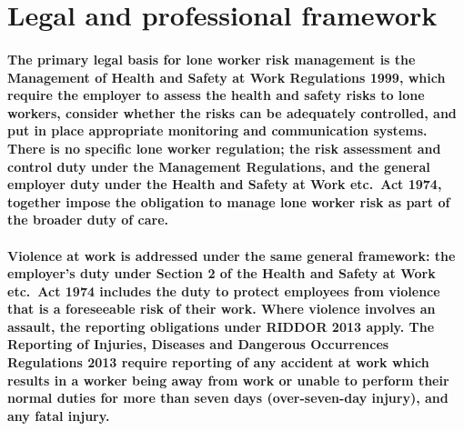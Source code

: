 \section{Legal and professional framework}

\paragraph{The primary legal basis for lone worker risk management is the Management of Health and Safety at Work Regulations 1999, which require the employer to assess the health and safety risks to lone workers, consider whether the risks can be adequately controlled, and put in place appropriate monitoring and communication systems. There is no specific lone worker regulation; the risk assessment and control duty under the Management Regulations, and the general employer duty under the Health and Safety at Work etc.\ Act 1974, together impose the obligation to manage lone worker risk as part of the broader duty of care.}

\paragraph{Violence at work is addressed under the same general framework: the employer's duty under Section 2 of the Health and Safety at Work etc.\ Act 1974 includes the duty to protect employees from violence that is a foreseeable risk of their work. Where violence involves an assault, the reporting obligations under RIDDOR 2013 apply. The Reporting of Injuries, Diseases and Dangerous Occurrences Regulations 2013 require reporting of any accident at work which results in a worker being away from work or unable to perform their normal duties for more than seven days (over-seven-day injury), and any fatal injury.}

